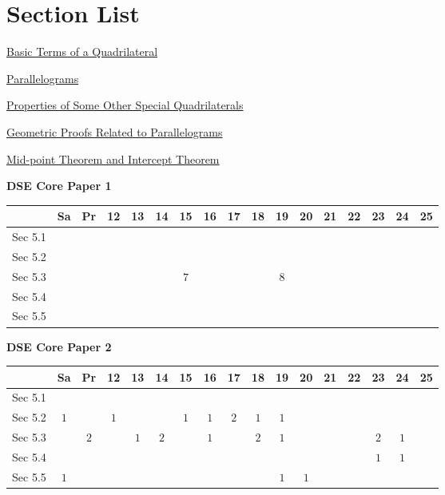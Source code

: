 \documentclass[12pt, a4paper]{article}
\begin{document}
\section*{Section List}
\begin{enumx}[label=Sec 5.\arabic*\ ]
\item \hyperref[section:3-5-1]{Basic Terms of a Quadrilateral}
\item \hyperref[section:3-5-2]{Parallelograms}
\item \hyperref[section:3-5-3]{Properties of Some Other Special Quadrilaterals}
\item \hyperref[section:3-5-4]{Geometric Proofs Related  to Parallelograms  \NF}
\item \hyperref[section:3-5-5]{Mid-point Theorem and Intercept Theorem  \NF}
\end{enumx}
\begin{absolutelynopagebreak}
\begin{center}
\textbf{DSE Core Paper 1}
\end{center}
\begin{center}
\begin{tabular}{|l|c|c|c|c|c|c|c|c|c|c|c|c|c|c|c|c|}
\hline
        & Sa & Pr & 12 & 13 & 14 & 15 & 16 & 17 & 18 & 19 & 20 & 21 & 22 & 23 & 24 & 25 \\\hline\hline
Sec 5.1 &  &  &  &  &  &  &  &  &  &  &  &  &  &  &  &  \\\hline
Sec 5.2 &  &  &  &  &  &  &  &  &  &  &  &  &  &  &  &  \\\hline
Sec 5.3 &  &  &  &  &  &  $7$ &  &  &  &  $8$ &  &  &  &  &  &  \\\hline
Sec 5.4 &  &  &  &  &  &  &  &  &  &  &  &  &  &  &  &  \\\hline
Sec 5.5 &  &  &  &  &  &  &  &  &  &  &  &  &  &  &  &  \\\hline
\end{tabular}
\end{center}
\end{absolutelynopagebreak}
\begin{absolutelynopagebreak}
\begin{center}
\textbf{DSE Core Paper 2}
\end{center}
\begin{center}
\begin{tabular}{|l|c|c|c|c|c|c|c|c|c|c|c|c|c|c|c|c|}
\hline
        & Sa & Pr & 12 & 13 & 14 & 15 & 16 & 17 & 18 & 19 & 20 & 21 & 22 & 23 & 24 & 25 \\\hline\hline
Sec 5.1 &  &  &  &  &  &  &  &  &  &  &  &  &  &  &  &  \\\hline
Sec 5.2 &  $1$ &  &  $1$ &  &  &  $1$ &  $1$ &  $2$ &  $1$ &  $1$ &  &  &  &  &  &  \\\hline
Sec 5.3 &  &  $2$ &  &  $1$ &  $2$ &  &  $1$ &  &  $2$ &  $1$ &  &  &  &  $2$ &  $1$ &  \\\hline
Sec 5.4 &  &  &  &  &  &  &  &  &  &  &  &  &  &  $1$ &  $1$ &  \\\hline
Sec 5.5 &  $1$ &  &  &  &  &  &  &  &  &  $1$ &  $1$ &  &  &  &  &  \\\hline
\end{tabular}
\end{center}
\end{absolutelynopagebreak}
\end{document}
